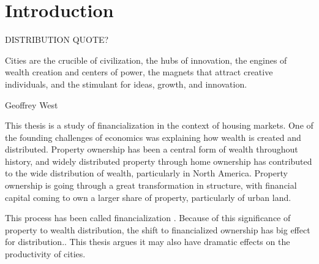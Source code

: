 \chapter{Introduction} \label{chapter-introduction}

\epigraph{DISTRIBUTION QUOTE?}{}
\epigraph{Cities are the crucible of civilization, the hubs of innovation, the engines of wealth creation and centers of power, the magnets that attract creative individuals, and the stimulant for ideas, growth, and innovation.}{Geoffrey West}

This thesis is a study of financialization in the context of housing markets.
One of the founding challenges of economics was explaining how wealth is created and distributed. Property ownership has  been a central form of wealth %
throughout history,  %
and widely distributed property through home ownership has contributed to the wide distribution of wealth, particularly in North America\cite{pikettyCapitalTwentyfirstCentury2014}. %
Property ownership is going through a great transformation in structure, with financial capital coming to own a larger share of property,  particularly of urban land\cite{farhaReportFinancializationHousing2017, palleyFinancializationWhatIt2007}. %


This process has been called financialization \cite{hansenFinanceCapitalismFinancialization2014, hansenFinanceCapitalismFinancialization2014}. 
Because of this significance of property to wealth distribution, the shift to financialized ownership %
has big effect for distribution.\cite{tomaskovic-deveyFinancializationCausesInequality2013, palleyFinancializationWhatIt2007, seccarecciaUnderstandingFinancializationHistory2013, nemtinFinancializationHousingSocial2021}. %
This thesis argues it may also have dramatic effects on the productivity of cities.

